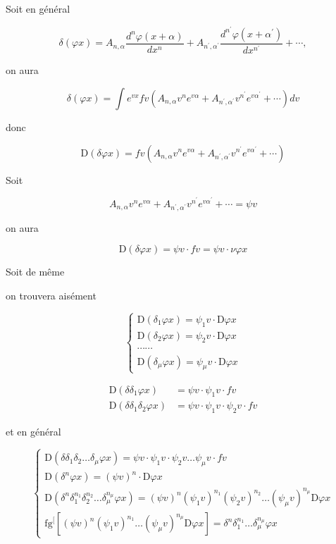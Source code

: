 \documentclass{article}
\begin{document}
Soit en général

\[
\delta(\varphi x)=A_{n, \alpha} \frac{d^{n} \varphi(x+\alpha)}{d x^{n}}+A_{n^{\prime}, \alpha^{\prime}} \frac{d^{n^{\prime}} \varphi\left(x+\alpha^{\prime}\right)}{d x^{n^{\prime}}}+\cdots,
\]

on aura

\[
\delta(\varphi x)=\int e^{v x} f v\left(A_{n, \alpha} v^{n} e^{v \alpha}+A_{n^{\prime}, \alpha^{\prime}} v^{n^{\prime}} e^{v \alpha^{\prime}}+\cdots\right) d v
\]

donc

\[
\mathrm{D}(\delta \varphi x)=f v\left(A_{n, \alpha} v^{n} e^{v \alpha}+A_{n^{\prime}, \alpha^{\prime}} v^{n^{\prime}} e^{v \alpha^{\prime}}+\cdots\right)
\]

Soit

\[
A_{n, \alpha} v^{n} e^{v \alpha}+A_{n^{\prime}, \alpha^{\prime}} v^{n^{\prime}} e^{v \alpha^{\prime}}+\cdots=\psi v
\]

on aura

\[
\mathrm{D}(\delta \varphi x)=\psi v \cdot f v=\psi v \cdot \nu \varphi x
\]

Soit de même

on trouvera aisément

\[
\left\{\begin{array}{l}
\mathrm{D}\left(\delta_{1} \varphi x\right)=\psi_{1} v \cdot \mathrm{D} \varphi x \\
\mathrm{D}\left(\delta_{2} \varphi x\right)=\psi_{2} v \cdot \mathrm{D} \varphi x \\
\cdots \cdots \\
\mathrm{D}\left(\delta_{\mu} \varphi x\right)=\psi_{\mu} v \cdot \mathrm{D} \varphi x
\end{array}\right.
\]

\[
\begin{aligned}
\mathrm{D}\left(\delta \delta_{1} \varphi x\right) & =\psi v \cdot \psi_{1} v \cdot f v \\
\mathrm{D}\left(\delta \delta_{1} \delta_{2} \varphi x\right) & =\psi v \cdot \psi_{1} v \cdot \psi_{2} v \cdot f v
\end{aligned}
\]

et en général

\[
\left\{\begin{array}{l}
\mathrm{D}\left(\delta \delta_{1} \delta_{2} \ldots \delta_{\mu} \varphi x\right)=\psi v \cdot \psi_{1} v \cdot \psi_{2} v \ldots \psi_{\mu} v \cdot f v \\
\mathrm{D}\left(\delta^{n} \varphi x\right)=(\psi v)^{n} \cdot \mathrm{D} \varphi x \\
\mathrm{D}\left(\delta^{n} \delta_{1}^{n_{1}} \delta_{2}^{n_{2}} \ldots \delta_{\mu}^{n_{\mu}} \varphi x\right)=(\psi v)^{n}\left(\psi_{1} v\right)^{n_{1}}\left(\psi_{2} v\right)^{n_{2}} \ldots\left(\psi_{\mu} v\right)^{n_{\mu}} \mathrm{D} \varphi x \\
\mathrm{fg}^{[}\left[(\psi v)^{n}\left(\psi_{1} v\right)^{n_{1}} \ldots\left(\psi_{\mu} v\right)^{n_{\mu}} \mathrm{D} \varphi x\right]=\delta^{n} \delta_{1}^{n_{1}} \ldots \delta_{\mu}^{n_{\mu}} \varphi x
\end{array}\right.
\]
\end{document}

